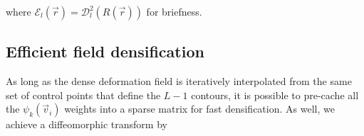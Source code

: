     where $\mathcal{E}_l(\vec{r}) = \mathcal{D}^2_{l}(R(\vec{r}))$ for briefness.

\subsection*{Efficient field densification}
As long as the dense deformation field is iteratively interpolated
from the same set of control points that define the $L-1$ contours,
it is possible to pre-cache all the $\psi_k(\vec{v}_i)$ weights into a
sparse matrix for fast densification. As well, we achieve a
diffeomorphic transform by